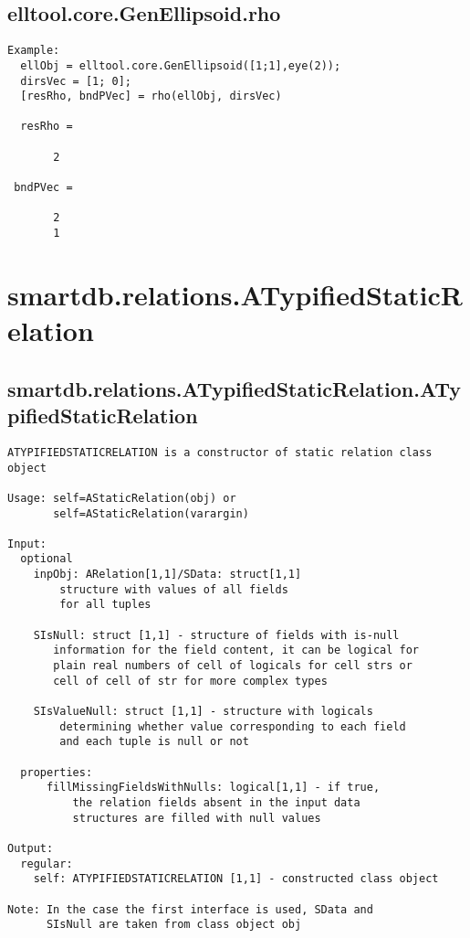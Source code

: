 \subsection{\texorpdfstring{elltool.core.GenEllipsoid.rho}{rho}}\label{method:elltool.core.GenEllipsoid.rho}
\begin{verbatim}
Example:
  ellObj = elltool.core.GenEllipsoid([1;1],eye(2));
  dirsVec = [1; 0];
  [resRho, bndPVec] = rho(ellObj, dirsVec)

  resRho =

       2

 bndPVec =

       2
       1
\end{verbatim}
\section{smartdb.relations.ATypifiedStaticRelation}\label{secClassDescr:smartdb.relations.ATypifiedStaticRelation}
\subsection{\texorpdfstring{smartdb.relations.ATypifiedStaticRelation.ATypifiedStaticRelation}{ATypifiedStaticRelation}}\label{method:smartdb.relations.ATypifiedStaticRelation.ATypifiedStaticRelation}
\begin{verbatim}
ATYPIFIEDSTATICRELATION is a constructor of static relation class
object

Usage: self=AStaticRelation(obj) or
       self=AStaticRelation(varargin)

Input:
  optional
    inpObj: ARelation[1,1]/SData: struct[1,1]
        structure with values of all fields
        for all tuples

    SIsNull: struct [1,1] - structure of fields with is-null
       information for the field content, it can be logical for
       plain real numbers of cell of logicals for cell strs or
       cell of cell of str for more complex types

    SIsValueNull: struct [1,1] - structure with logicals
        determining whether value corresponding to each field
        and each tuple is null or not

  properties:
      fillMissingFieldsWithNulls: logical[1,1] - if true,
          the relation fields absent in the input data
          structures are filled with null values

Output:
  regular:
    self: ATYPIFIEDSTATICRELATION [1,1] - constructed class object

Note: In the case the first interface is used, SData and
      SIsNull are taken from class object obj
\end{verbatim}
